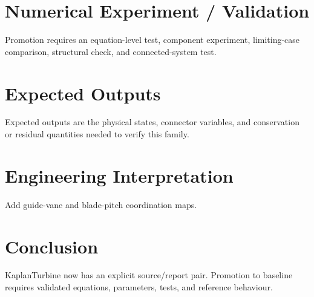 \documentclass[10pt,a4paper]{article}
\begin{document}
\section{Numerical Experiment / Validation}Promotion requires an equation-level test, component experiment, limiting-case comparison, structural check, and connected-system test.
\section{Expected Outputs}Expected outputs are the physical states, connector variables, and conservation or residual quantities needed to verify this family.
\section{Engineering Interpretation}Add guide-vane and blade-pitch coordination maps.
\section*{Conclusion}KaplanTurbine now has an explicit source/report pair. Promotion to baseline requires validated equations, parameters, tests, and reference behaviour.
\end{document}
